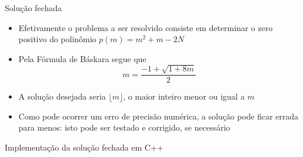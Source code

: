 \begin{frame}[fragile]{Solução fechada}

    \begin{itemize}
        \item Efetivamente o problema a ser resolvido consiste em determinar o zero positivo do polinômio $p(m) = m^2 + m - 2N$

        \item Pela Fórmula de Báskara segue que
$$m = \frac{-1 + \sqrt{1 + 8m}}{2}$$

        \item A solução desejada seria $\lfloor{m}\rfloor$, o maior inteiro menor ou igual a $m$

        \item Como pode ocorrer um erro de precisão numérica, a solução pode ficar errada para menos: isto pode ser testado e corrigido, se necessário
    \end{itemize}

\end{frame}

\begin{frame}[fragile]{Implementação da solução fechada em C++}


\end{frame}
